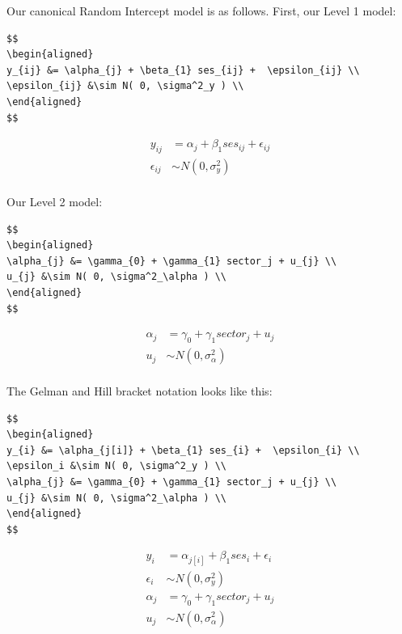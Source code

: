 \documentclass[
  letterpaper,
  DIV=11,
  numbers=noendperiod]{scrreprt}
\begin{document}
Our canonical Random Intercept model is as follows. First, our Level 1
model:

\begin{verbatim}
$$
\begin{aligned}
y_{ij} &= \alpha_{j} + \beta_{1} ses_{ij} +  \epsilon_{ij} \\
\epsilon_{ij} &\sim N( 0, \sigma^2_y ) \\
\end{aligned}
$$
\end{verbatim}

\[
\begin{aligned}
y_{ij} &= \alpha_{j} + \beta_{1} ses_{ij} +  \epsilon_{ij} \\
\epsilon_{ij} &\sim N( 0, \sigma^2_y ) \\
\end{aligned}
\]

Our Level 2 model:

\begin{verbatim}
$$
\begin{aligned}
\alpha_{j} &= \gamma_{0} + \gamma_{1} sector_j + u_{j} \\
u_{j} &\sim N( 0, \sigma^2_\alpha ) \\
\end{aligned}
$$
\end{verbatim}

\[
\begin{aligned}
\alpha_{j} &= \gamma_{0} + \gamma_{1} sector_j + u_{j} \\
u_{j} &\sim N( 0, \sigma^2_\alpha ) \\
\end{aligned}
\]

The Gelman and Hill bracket notation looks like this:

\begin{verbatim}
$$
\begin{aligned}
y_{i} &= \alpha_{j[i]} + \beta_{1} ses_{i} +  \epsilon_{i} \\
\epsilon_i &\sim N( 0, \sigma^2_y ) \\
\alpha_{j} &= \gamma_{0} + \gamma_{1} sector_j + u_{j} \\
u_{j} &\sim N( 0, \sigma^2_\alpha ) \\
\end{aligned}
$$
\end{verbatim}

\[
\begin{aligned}
y_{i} &= \alpha_{j[i]} + \beta_{1} ses_{i} +  \epsilon_{i} \\
\epsilon_i &\sim N( 0, \sigma^2_y ) \\
\alpha_{j} &= \gamma_{0} + \gamma_{1} sector_j + u_{j} \\
u_{j} &\sim N( 0, \sigma^2_\alpha ) \\
\end{aligned}
\]
\end{document}
